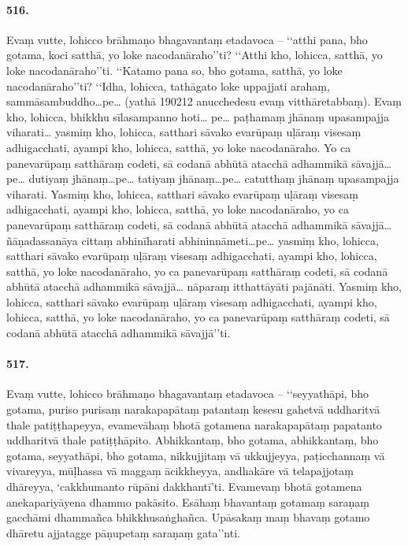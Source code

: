 \paragraph{516.} Evaṃ vutte, lohicco brāhmaṇo bhagavantaṃ etadavoca – ‘‘atthi pana, bho gotama, koci satthā, yo loke nacodanāraho’’ti? ‘‘Atthi kho, lohicca, satthā, yo loke nacodanāraho’’ti. ‘‘Katamo pana so, bho gotama, satthā, yo loke nacodanāraho’’ti? ‘‘Idha, lohicca, tathāgato loke uppajjati arahaṃ, sammāsambuddho…pe… (yathā 190212 anucchedesu evaṃ vitthāretabbaṃ). Evaṃ kho, lohicca, bhikkhu sīlasampanno hoti… pe… paṭhamaṃ jhānaṃ upasampajja viharati… yasmiṃ kho, lohicca, satthari sāvako evarūpaṃ uḷāraṃ visesaṃ adhigacchati, ayampi kho, lohicca, satthā, yo loke nacodanāraho. Yo ca panevarūpaṃ satthāraṃ codeti, sā codanā abhūtā atacchā adhammikā sāvajjā…pe… dutiyaṃ jhānaṃ…pe… tatiyaṃ jhānaṃ…pe… catutthaṃ jhānaṃ upasampajja viharati. Yasmiṃ kho, lohicca, satthari sāvako evarūpaṃ uḷāraṃ visesaṃ adhigacchati, ayampi kho, lohicca, satthā, yo loke nacodanāraho, yo ca panevarūpaṃ satthāraṃ codeti, sā codanā abhūtā atacchā adhammikā sāvajjā… ñāṇadassanāya cittaṃ abhinīharati abhininnāmeti…pe… yasmiṃ kho, lohicca, satthari sāvako evarūpaṃ uḷāraṃ visesaṃ adhigacchati, ayampi kho, lohicca, satthā, yo loke nacodanāraho, yo ca panevarūpaṃ satthāraṃ codeti, sā codanā abhūtā atacchā adhammikā sāvajjā… nāparaṃ itthattāyāti pajānāti. Yasmiṃ kho, lohicca, satthari sāvako evarūpaṃ uḷāraṃ visesaṃ adhigacchati, ayampi kho, lohicca, satthā, yo loke nacodanāraho, yo ca panevarūpaṃ satthāraṃ codeti, sā codanā abhūtā atacchā adhammikā sāvajjā’’ti.

\paragraph{517.} Evaṃ vutte, lohicco brāhmaṇo bhagavantaṃ etadavoca – ‘‘seyyathāpi, bho gotama, puriso purisaṃ narakapapātaṃ patantaṃ kesesu gahetvā uddharitvā thale patiṭṭhapeyya, evamevāhaṃ bhotā gotamena narakapapātaṃ papatanto uddharitvā thale patiṭṭhāpito. Abhikkantaṃ, bho gotama, abhikkantaṃ, bho gotama, seyyathāpi, bho gotama, nikkujjitaṃ vā ukkujjeyya, paṭicchannaṃ vā vivareyya, mūḷhassa vā maggaṃ ācikkheyya, andhakāre vā telapajjotaṃ dhāreyya, ‘cakkhumanto rūpāni dakkhantī’ti. Evamevaṃ bhotā gotamena anekapariyāyena dhammo pakāsito. Esāhaṃ bhavantaṃ gotamaṃ saraṇaṃ gacchāmi dhammañca bhikkhusaṅghañca. Upāsakaṃ maṃ bhavaṃ gotamo dhāretu ajjatagge pāṇupetaṃ saraṇaṃ gata’’nti.

